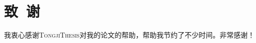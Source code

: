 \documentclass[]{tongjithesis}
\numberwithin{equation}{chapter}
\begin{document}
{
	\printbibliography[]
}
\clearpage
{}
\chapter*{致~谢}
我衷心感谢\textsc{TongjiThesis}对我的论文的帮助，帮助我节约了不少时间。非常感谢！
\end{document}
